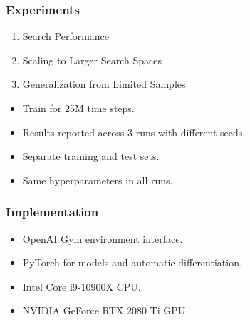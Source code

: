 \begin{frame}
    \frametitle{Experiments}

    \begin{enumerate}
        \item Search Performance
        \item Scaling to Larger Search Spaces
        \item Generalization from Limited Samples
    \end{enumerate}

    \begin{itemize}
        \item Train for 25M time steps.
        \item Results reported across 3 runs with different seeds.
        \item Separate training and test sets.
        \item Same hyperparameters in all runs.
    \end{itemize}
\end{frame}


\begin{frame}
    \frametitle{Implementation}

    \begin{itemize}
        \item OpenAI Gym environment interface.
        \item PyTorch for models and automatic differentiation.
        \item Intel Core i9-10900X CPU.
        \item NVIDIA GeForce RTX 2080 Ti GPU.
    \end{itemize}
\end{frame}